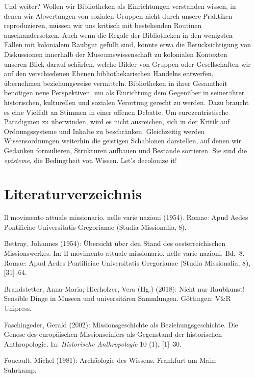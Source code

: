 \documentclass[a4paper,
fontsize=11pt,
oneside,
numbers=noperiodatend,
parskip=half-,
bibliography=totoc,
final
]{scrartcl}
\begin{document}
Und weiter? Wollen wir Bibliotheken als Einrichtungen verstanden wissen,
in denen wir Abwertungen von sozialen Gruppen nicht durch unsere
Praktiken reproduzieren, müssen wir uns kritisch mit bestehenden
Routinen auseinandersetzen. Auch wenn die Regale der Bibliotheken in den
wenigsten Fällen mit kolonialem Raubgut gefüllt sind, könnte etwa die
Berücksichtigung von Diskussionen innerhalb der Museumswissenschaft zu
kolonialen Kontexten unseren Blick darauf schärfen, welche Bilder von
Gruppen oder Gesellschaften wir auf den verschiedenen Ebenen
bibliothekarischen Handelns entwerfen, übernehmen beziehungsweise
vermitteln. Bibliotheken in ihrer Gesamtheit benötigen neue
Perspektiven, um als Einrichtung dem Gegenüber in seiner:ihrer
historischen, kulturellen und sozialen Verortung gerecht zu werden. Dazu
braucht es eine Vielfalt an Stimmen in einer offenen Debatte. Um
eurozentristische Paradigmen zu überwinden, wird es nicht ausreichen,
sich in der Kritik auf Ordnungssysteme und Inhalte zu beschränken.
Gleichzeitig werden Wissensordnungen weiterhin die geistigen Schablonen
darstellen, auf denen wir Gedanken formulieren, Strukturen aufbauen und
Bestände sortieren. Sie sind die \emph{episteme}, die Bedingtheit von
Wissen. Let's decolonize it!

\hypertarget{literaturverzeichnis}{%
\section{Literaturverzeichnis}\label{literaturverzeichnis}}

Il movimento attuale missionario. nelle varie nazioni (1954). Romae:
Apud Aedes Pontificiae Universitatis Gregorianae (Studia Missionalia,
8).

Bettray, Johannes (1954): Übersicht über den Stand des oesterreichischen
Missionswerkes. In: Il movimento attuale missionario. nelle varie
nazioni, Bd.~8. Romae: Apud Aedes Pontificiae Universitatis Gregorianae
(Studia Missionalia, 8), {[}31{]}--64.

Brandstetter, Anna-Maria; Hierholzer, Vera (Hg.) (2018): Nicht nur
Raubkunst! Sensible Dinge in Museen und universitären Sammlungen.
Göttingen: V\&R Unipress.

Faschingeder, Gerald (2002): Missionsgeschichte als
Beziehungsgeschichte. Die Genese des europäischen Missionseinfers als
Gegenstand der historischen Anthropologie. In: \emph{Historische
Anthropologie} 10 (1), {[}1{]}--30.

Foucault, Michel (1981): Archäologie des Wissens. Frankfurt am Main:
Suhrkamp.
\end{document}
